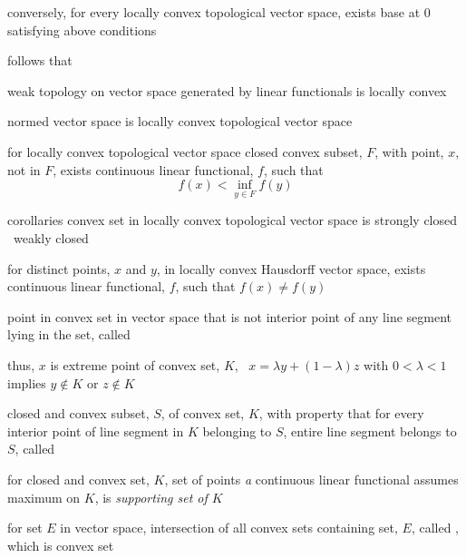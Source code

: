 \documentclass[17pt,landscape]{foils}
\begin{document}
{{	\vitem conversely, for every locally convex topological vector space,
		exists base at $0$ satisfying above conditions

	\vvitem follows that

	\bit
		\item weak topology on vector space generated by linear functionals
			is locally convex

		\item normed vector space is locally convex topological vector space
	\eit
\eit



\bit
	\item for locally convex topological vector space
		closed convex subset, $F$,
		with point, $x$, not in $F$,
		exists continuous linear functional, $f$,
		such that
		\[
			f(x) < \inf_{y\in F} f(y)
		\]

	\vitem corollaries
	\bit
		\vitem convex set in locally convex topological vector space
			is strongly closed \iaoi\ weakly closed

		\vitem for distinct points, $x$ and $y$,
			in locally convex Hausdorff vector space,
			exists continuous linear functional, $f$,
			such that $f(x)\neq f(y)$
	\eit
\eit



\bit
	\item point in convex set in vector space
		that is not interior point of any line segment lying in the set,
		called 

	\vitem thus,
		$x$ is extreme point of convex set, $K$, \iaoi\
		$x=\lambda y + (1-\lambda) z$ with $0<\lambda<1$ implies $y\not\in K$ or $z\not\in K$

	\vvitem closed and convex subset, $S$, of convex set, $K$,
		with property that
		for every interior point of line segment in $K$ belonging to $S$,
		entire line segment belongs to $S$,
		called 

	\vitem for closed and convex set, $K$,
		set of points \emph{a} continuous linear functional assumes maximum on $K$,
		is \emph{supporting set of $K$}
\eit



\bit
	\item for set $E$ in vector space,
		intersection of all convex sets containing set, $E$,
		called ,
		which is convex set

}}
\end{document}
